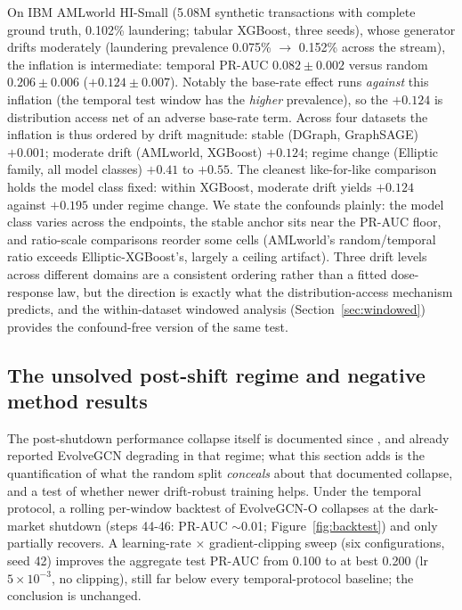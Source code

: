 \documentclass{article}
\begin{document}
On IBM AMLworld HI-Small (5.08M synthetic transactions with complete ground
truth, 0.102\% laundering; tabular XGBoost, three seeds), whose generator drifts
moderately (laundering prevalence 0.075\% $\rightarrow$ 0.152\% across the
stream), the inflation is intermediate: temporal PR-AUC $0.082\pm0.002$ versus
random $0.206\pm0.006$ ($+0.124\pm0.007$). Notably the base-rate effect runs
\emph{against} this inflation (the temporal test window has the \emph{higher}
prevalence), so the $+0.124$ is distribution access net of an adverse base-rate
term. Across four datasets the inflation is thus ordered by drift magnitude:
stable (DGraph, GraphSAGE) $+0.001$; moderate drift (AMLworld, XGBoost) $+0.124$;
regime change (Elliptic family, all model classes) $+0.41$ to $+0.55$. The
cleanest like-for-like comparison holds the model class fixed: within XGBoost,
moderate drift yields $+0.124$ against $+0.195$ under regime change. We state the
confounds plainly: the model class varies across the endpoints, the stable
anchor sits near the PR-AUC floor, and ratio-scale comparisons reorder some
cells (AMLworld's random/temporal ratio exceeds Elliptic-XGBoost's, largely a
ceiling artifact). Three drift levels across different domains are a consistent
ordering rather than a fitted dose-response law, but the direction is exactly
what the distribution-access mechanism predicts, and the within-dataset windowed
analysis (Section~\ref{sec:windowed}) provides the confound-free version of the
same test.

\subsection{The unsolved post-shift regime and negative method results}
The post-shutdown performance collapse itself is documented since
\citet{weber2019aml}, and \citet{pareja2020evolvegcn} already reported EvolveGCN
degrading in that regime; what this section adds is the quantification of what
the random split \emph{conceals} about that documented collapse, and a test of
whether newer drift-robust training helps. Under the temporal protocol, a
rolling per-window backtest of EvolveGCN-O \citep{pareja2020evolvegcn} collapses
at the dark-market shutdown (steps 44-46: PR-AUC $\sim$0.01;
Figure~\ref{fig:backtest}) and only partially recovers. A
learning-rate $\times$ gradient-clipping sweep (six configurations, seed 42)
improves the aggregate test PR-AUC from 0.100 to at best 0.200 (lr
$5{\times}10^{-3}$, no clipping), still far below every temporal-protocol
baseline; the conclusion is unchanged.
\end{document}
